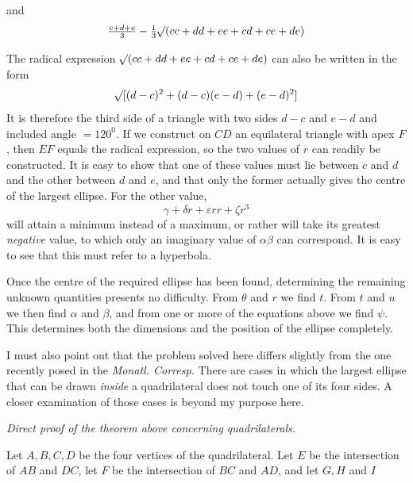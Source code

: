 %
and
\[
\tfrac{c+d+e}{3}-\tfrac13\mathord{{}^{}\!\surd}(cc+dd+ee+cd+ce+de)
\]

The radical expression \(\mathord{{}^{}\!\surd}(cc+dd+ee+cd+ce+de)\) can also be written in the form
\[
\mathord{{}^{}\!\surd}[(d-c)^2+(d-c)(e-d)+(e-d)^2]
\]
It is therefore the third side of a triangle with two sides \(d-c\) and \(e-d\) and included angle \(=120^0\). If we construct on \(CD\) an equilateral triangle with apex \(F\), then \(EF\) equals the radical expression, so the two values of \(r\) can readily be constructed. It is easy to show that one of these values must lie between \(c\) and \(d\) and the other between \(d\) and \(e\), and that only the former actually gives the centre of the largest ellipse. For the other value,
\[
\gamma+\delta r+\varepsilon rr+\zeta r^3
\]
will attain a minimum instead of a maximum, or rather will take its greatest \textit{negative} value, to which only an imaginary value of \(\alpha\beta\) can correspond. It is easy to see that this must refer to a hyperbola.

Once the centre of the required ellipse has been found, determining the remaining unknown quantities presents no difficulty. From \(\theta\) and \(r\) we find \(t\). From \(t\) and \(u\) we then find \(\alpha\) and \(\beta\), and from one or more of the equations above we find \(\psi\). This determines both the dimensions and the position of the ellipse completely.

I must also point out that the problem solved here differs slightly from the one recently posed in the \textit{Monatl. Corresp.} There are cases in which the largest ellipse that can be drawn \textit{inside} a quadrilateral does not touch one of its four sides. A closer examination of those cases is beyond my purpose here.

\par\medskip{}
\begin{center}\textit{Direct proof of the theorem above concerning quadrilaterals.}\end{center}
\hspace*{\parindent}Let \(A,B,C,D\) be the four vertices of the quadrilateral. Let \(E\) be the intersection of \(AB\) and \(DC\), let \(F\) be the intersection of \(BC\) and \(AD\), and let \(G,H\) and \(I\)
